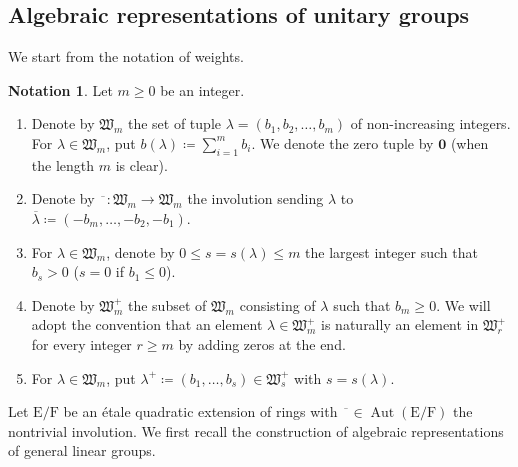 \documentclass[12pt]{amsart}
\numberwithin{equation}{section}
\theoremstyle{plain}
\theoremstyle{definition}
\newtheorem{notation}[proposition]{Notation}
\theoremstyle{remark}
\renewcommand{\b}[1]{\mathbf{#1}}
\newcommand{\f}[1]{\mathfrak{#1}}
\renewcommand{\r}[1]{\mathrm{#1}}
\renewcommand{\(}{\left(}
\renewcommand{\)}{\right)}
\newcommand{\ol}[1]{\overline{#1}{}}
\renewcommand{\leq}{\leqslant}
\renewcommand{\geq}{\geqslant}
\newcommand{\fW}{\f W}
\newcommand{\rE}{\r E}
\newcommand{\rF}{\r F}
\DeclareMathOperator{\Aut}{Aut}
\begin{document}
\subsection{Algebraic representations of unitary groups}
\label{ss:representation_unitary}

We start from the notation of weights.

\begin{notation}\label{no:weight}
Let $m\geq 0$ be an integer.
\begin{enumerate}
     \item Denote by $\fW_m$ the set of tuple $\lambda=(b_1,b_2,\dots,b_m)$ of non-increasing integers. For $\lambda\in\fW_m$, put $b(\lambda)\coloneqq\sum_{i=1}^m b_i$. We denote the zero tuple by $\b{0}$ (when the length $m$ is clear).

     \item Denote by $\ol{\phantom{a}}\colon\fW_m\to\fW_m$ the involution sending $\lambda$ to $\ol\lambda\coloneqq(-b_m,\dots,-b_2,-b_1)$.

     \item For $\lambda\in\fW_m$, denote by $0\leq s=s(\lambda)\leq m$ the largest integer such that $b_s>0$ ($s=0$ if $b_1\leq 0$).

     \item Denote by $\fW_m^+$ the subset of $\fW_m$ consisting of $\lambda$ such that $b_m\geq 0$. We will adopt the convention that an element $\lambda\in\fW_m^+$ is naturally an element in $\fW_r^+$ for every integer $r\geq m$ by adding zeros at the end.

     \item For $\lambda\in\fW_m$, put $\lambda^+\coloneqq(b_1,\dots,b_s)\in\fW_s^+$ with $s=s(\lambda)$.
\end{enumerate}
\end{notation}


Let $\rE/\rF$ be an \'{e}tale quadratic extension of rings with $\ol{\phantom{a}}\in\Aut(\rE/\rF)$ the nontrivial involution. We first recall the construction of algebraic representations of general linear groups.
\end{document}
